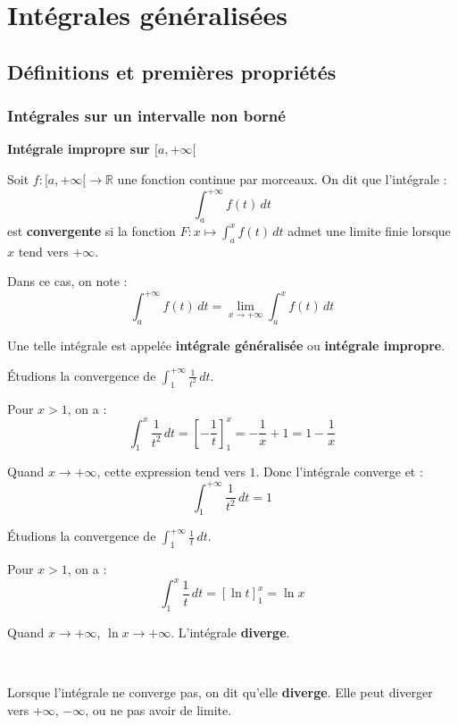 \documentclass[../PolyS4.tex]{subfiles}
\begin{document}
\setcounter{chapter}{5}
\chapter{Intégrales généralisées}

\section{Définitions et premières propriétés}

\subsection{Intégrales sur un intervalle non borné}

\begin{Def}
\textbf{Intégrale impropre sur $[a, +\infty[$}

Soit $f:[a,+\infty[\rightarrow \mathbb{R}$ une fonction continue par morceaux. On dit que l'intégrale :
$$\int_{a}^{+\infty} f(t) \, dt$$
est \textbf{convergente} si la fonction $F : x \mapsto \int_{a}^{x} f(t) \, dt$ admet une limite finie lorsque $x$ tend vers $+\infty$.

Dans ce cas, on note :
$$\int_{a}^{+\infty} f(t) \, dt = \lim_{x \to +\infty} \int_{a}^{x} f(t) \, dt$$

Une telle intégrale est appelée \textbf{intégrale généralisée} ou \textbf{intégrale impropre}.
\end{Def}

\begin{Ex}
Étudions la convergence de $\displaystyle\int_{1}^{+\infty} \frac{1}{t^2} \, dt$.

Pour $x > 1$, on a :
$$\int_{1}^{x} \frac{1}{t^2} \, dt = \left[-\frac{1}{t}\right]_{1}^{x} = -\frac{1}{x} + 1 = 1 - \frac{1}{x}$$

Quand $x \to +\infty$, cette expression tend vers $1$. Donc l'intégrale converge et :
$$\int_{1}^{+\infty} \frac{1}{t^2} \, dt = 1$$
\end{Ex}

\begin{Ex}
Étudions la convergence de $\displaystyle\int_{1}^{+\infty} \frac{1}{t} \, dt$.

Pour $x > 1$, on a :
$$\int_{1}^{x} \frac{1}{t} \, dt = \left[\ln t\right]_{1}^{x} = \ln x$$

Quand $x \to +\infty$, $\ln x \to +\infty$. L'intégrale \textbf{diverge}.
\end{Ex}

\begin{Rmq}$\,$

Lorsque l'intégrale ne converge pas, on dit qu'elle \textbf{diverge}. Elle peut diverger vers $+\infty$, $-\infty$, ou ne pas avoir de limite.
\end{Rmq}
\end{document}
